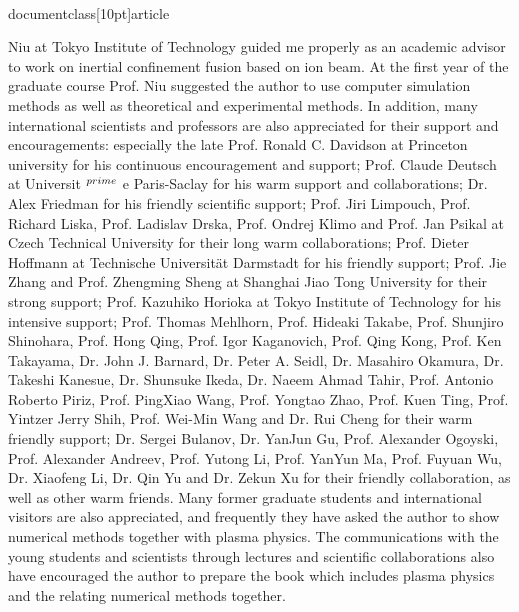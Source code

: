 \\documentclass[10pt]{article}
\begin{document}
Niu at Tokyo Institute of Technology guided me properly as an academic advisor to work on inertial confinement fusion based on ion beam. At the first year of the graduate course Prof. Niu suggested the author to use computer simulation methods as well as theoretical and experimental methods. In addition, many international scientists and professors are also appreciated for their support and encouragements: especially the late Prof. Ronald C. Davidson at Princeton university for his continuous encouragement and support; Prof. Claude Deutsch at Universit ${ }^{\\prime}$ e Paris-Saclay for his warm support and collaborations; Dr. Alex Friedman for his friendly scientific support; Prof. Jiri Limpouch, Prof. Richard Liska, Prof. Ladislav Drska, Prof. Ondrej Klimo and Prof. Jan Psikal at Czech Technical University for their long warm collaborations; Prof. Dieter Hoffmann at Technische Universität Darmstadt for his friendly support; Prof. Jie Zhang and Prof. Zhengming Sheng at Shanghai Jiao Tong University for their strong support; Prof. Kazuhiko Horioka at Tokyo Institute of Technology for his intensive support; Prof. Thomas Mehlhorn, Prof. Hideaki Takabe, Prof. Shunjiro Shinohara, Prof. Hong Qing, Prof. Igor Kaganovich, Prof. Qing Kong, Prof. Ken Takayama, Dr. John J. Barnard, Dr. Peter A. Seidl, Dr. Masahiro Okamura, Dr. Takeshi Kanesue, Dr. Shunsuke Ikeda, Dr. Naeem Ahmad Tahir, Prof. Antonio Roberto Piriz, Prof. PingXiao Wang, Prof. Yongtao Zhao, Prof. Kuen Ting, Prof. Yintzer Jerry Shih, Prof. Wei-Min Wang and Dr. Rui Cheng for their warm friendly support; Dr. Sergei Bulanov, Dr. YanJun Gu, Prof. Alexander Ogoyski, Prof. Alexander Andreev, Prof. Yutong Li, Prof. YanYun Ma, Prof. Fuyuan Wu, Dr. Xiaofeng Li, Dr. Qin Yu and Dr. Zekun Xu for their friendly collaboration, as well as other warm friends. Many former graduate students and international visitors are also appreciated, and frequently they have asked the author to show numerical methods together with plasma physics. The communications with the young students and scientists through lectures and scientific collaborations also have encouraged the author to prepare the book which includes plasma physics and the relating numerical methods together.
\end{document}
